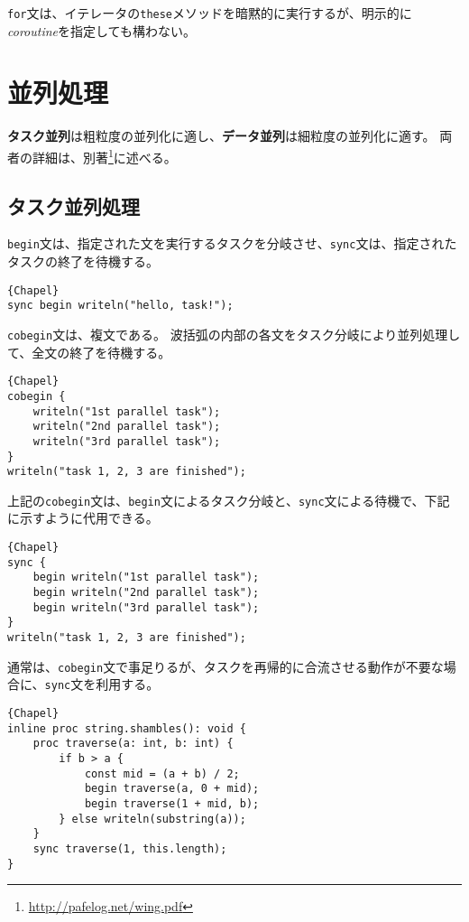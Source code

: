 \documentclass[10pt,a4paper]{book}
\begin{document}
\verb#for#文は、イテレータの\verb#these#メソッドを暗黙的に実行するが、明示的に\textit{coroutine}を指定しても構わない。

\chapter{並列処理}

\textbf{タスク並列}は粗粒度の並列化に適し、\textbf{データ並列}は細粒度の並列化に適す。
両者の詳細は、別著\footnote{\url{http://pafelog.net/wing.pdf}}に述べる。

\section{タスク並列処理}

\verb#begin#文は、指定された文を実行するタスクを分岐させ、\verb#sync#文は、指定されたタスクの終了を待機する。

\begin{Verbatim}{Chapel}
sync begin writeln("hello, task!");
\end{Verbatim}

\verb#cobegin#文は、複文である。
波括弧の内部の各文をタスク分岐により並列処理して、全文の終了を待機する。

\begin{Verbatim}{Chapel}
cobegin {
	writeln("1st parallel task");
	writeln("2nd parallel task"); 
	writeln("3rd parallel task"); 
}
writeln("task 1, 2, 3 are finished");
\end{Verbatim}

上記の\verb#cobegin#文は、\verb#begin#文によるタスク分岐と、\verb#sync#文による待機で、下記に示すように代用できる。

\begin{Verbatim}{Chapel}
sync {
	begin writeln("1st parallel task");
	begin writeln("2nd parallel task"); 
	begin writeln("3rd parallel task"); 
}
writeln("task 1, 2, 3 are finished");
\end{Verbatim}

通常は、\verb#cobegin#文で事足りるが、タスクを再帰的に合流させる動作が不要な場合に、\verb#sync#文を利用する。

\begin{Verbatim}{Chapel}
inline proc string.shambles(): void {
	proc traverse(a: int, b: int) {
		if b > a {
			const mid = (a + b) / 2;
			begin traverse(a, 0 + mid);
			begin traverse(1 + mid, b);
		} else writeln(substring(a));
	}
	sync traverse(1, this.length);
}
\end{Verbatim}
\end{document}

